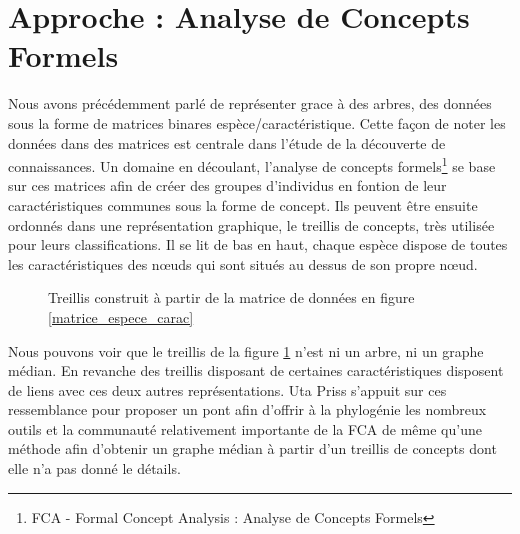 \section{Approche : Analyse de Concepts Formels}

Nous avons précédemment parlé de représenter grace à des arbres, des données sous la forme de matrices binares espèce/caractéristique. Cette façon de noter les données dans des matrices est centrale dans l'étude de la découverte de connaissances. Un domaine en découlant, l'analyse de concepts formels\footnote{FCA - Formal Concept Analysis : Analyse de Concepts Formels} se base sur ces matrices afin de créer des groupes d'individus en fontion de leur caractéristiques communes sous la forme de concept. Ils peuvent être ensuite ordonnés dans une représentation graphique, le treillis de concepts, très utilisée pour leurs classifications. Il se lit de bas en haut, chaque espèce dispose de toutes les caractéristiques des n\oe uds qui sont situés au dessus de son propre n\oe ud.

\begin{figure}[H]
	\begin{center}
	\end{center}
	\caption{Treillis construit à partir de la matrice de données en figure \ref{matrice_espece_carac}}
	\label{treillis_exemple}
\end{figure}

Nous pouvons voir que le treillis de la figure \ref{treillis_exemple} n'est ni un arbre, ni un graphe médian. En revanche des treillis disposant de certaines caractéristiques disposent de liens avec ces deux autres représentations. Uta Priss s'appuit sur ces ressemblance pour proposer un pont afin d'offrir à la phylogénie les nombreux outils et la communauté relativement importante de la FCA de même qu'une méthode afin d'obtenir un graphe médian à partir d'un treillis de concepts dont elle n'a pas donné le détails.

